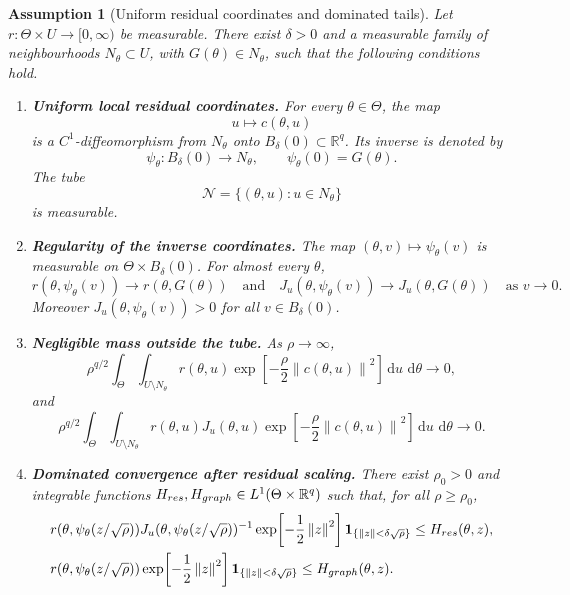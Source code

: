 \documentclass[10pt,a4paper]{amsart}
\newtheorem{assumption}{Assumption}
\newcommand{\R}{\mathbb{R}}
\newcommand{\dd}{\,\mathrm{d}}
\newcommand{\norm}[1]{\left\lVert #1\right\rVert}
\begin{document}
\begin{assumption}[Uniform residual coordinates and dominated tails]
\label{ass:uniform_residual_coordinates}
Let \(r:\Theta\times U\to[0,\infty)\) be measurable. There exist \(\delta>0\) and a measurable family of neighbourhoods \(N_\theta\subset U\), with \(G(\theta)\in N_\theta\), such that the following conditions hold.

\begin{enumerate}[leftmargin=*]
 \item \textbf{Uniform local residual coordinates.}
 For every \(\theta\in\Theta\), the map
 \[
  u\mapsto c(\theta,u)
 \]
 is a \(C^1\)-diffeomorphism from \(N_\theta\) onto \(B_\delta(0)\subset\R^q\).
 Its inverse is denoted by
 \[
  \psi_\theta:B_\delta(0)\to N_\theta,
  \qquad
  \psi_\theta(0)=G(\theta).
 \]
 The tube
 \[
  \mathcal N=\{(\theta,u):u\in N_\theta\}
 \]
 is measurable.

 \item \textbf{Regularity of the inverse coordinates.}
 The map \((\theta,v)\mapsto \psi_\theta(v)\) is measurable on
 \(\Theta\times B_\delta(0)\). For almost every \(\theta\),
 \[
  r(\theta,\psi_\theta(v))\to r(\theta,G(\theta))
  \quad\text{and}\quad
  J_u(\theta,\psi_\theta(v))\to J_u(\theta,G(\theta))
  \quad\text{as }v\to0.
 \]
 Moreover \(J_u(\theta,\psi_\theta(v))>0\) for all \(v\in B_\delta(0)\).

 \item \textbf{Negligible mass outside the tube.}
 As \(\rho\to\infty\),
 \begin{equation}
  \rho^{q/2}
  \int_\Theta\int_{U\setminus N_\theta}
  r(\theta,u)
  \exp\!\left[-\frac{\rho}{2}\norm{c(\theta,u)}^2\right]
  \dd u\,\dd\theta
  \longrightarrow 0,
  \label{eq:assumption_tail_uncorrected}
 \end{equation}
 and
 \begin{equation}
  \rho^{q/2}
  \int_\Theta\int_{U\setminus N_\theta}
  r(\theta,u)J_u(\theta,u)
  \exp\!\left[-\frac{\rho}{2}\norm{c(\theta,u)}^2\right]
  \dd u\,\dd\theta
  \longrightarrow 0 .
  \label{eq:assumption_tail_corrected}
 \end{equation}

 \item \textbf{Dominated convergence after residual scaling.}
 There exist \(\rho_0>0\) and integrable functions
 \(H_{\rm res},H_{\rm graph}\in L^1(\Theta\times\R^q)\) such that, for all
 \(\rho\ge \rho_0\),
 \begin{align}
 &r(\theta,\psi_\theta(z/\sqrt{\rho}))
 J_u(\theta,\psi_\theta(z/\sqrt{\rho}))^{-1}
 \exp\!\left[-\frac{1}{2}\norm{z}^2\right]
 \mathbf 1_{\{\norm{z}<\delta\sqrt{\rho}\}}
 \le H_{\rm res}(\theta,z),
 \label{eq:assumption_dom_uncorrected}\\
 &r(\theta,\psi_\theta(z/\sqrt{\rho}))
 \exp\!\left[-\frac{1}{2}\norm{z}^2\right]
 \mathbf 1_{\{\norm{z}<\delta\sqrt{\rho}\}}
 \le H_{\rm graph}(\theta,z).
 \label{eq:assumption_dom_corrected}
 \end{align}


\end{enumerate}
\end{assumption}
\end{document}
